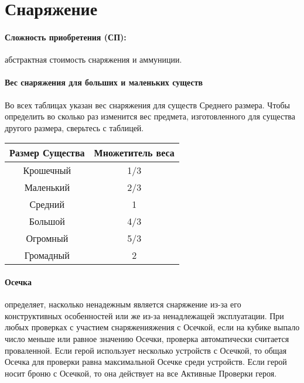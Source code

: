 \section{Снаряжение}
\paragraph{Сложность приобретения (СП):} абстрактная стоимость снаряжения и аммуниции.
\paragraph{Вес снаряжения для больших и маленьких существ}
Во всех таблицах указан вес снаряжения для существ Среднего размера. Чтобы определить во сколько раз изменится вес предмета, изготовленного для существа другого размера, сверьтесь с таблицей.
\begin{center}
\begin{tabular}{|c|c|}
\hline
Размер Существа & Множетитель веса \\ \hline
Крошечный & 1/3 \\ \hline
Маленький & 2/3 \\ \hline
Средний & 1 \\ \hline
Большой & 4/3 \\ \hline
Огромный & 5/3 \\ \hline
Громадный & 2 \\ \hline
\end{tabular}
\end{center}
\paragraph{Осечка} определяет, насколько ненадежным является снаряжение из-за его конструктивных особенностей или же из-за ненадлежащей эксплуатации. При любых проверках с участием снаряженияжения с Осечкой, если на кубике выпало число меньше или равное значению Осечки, проверка автоматически считается проваленной. Если герой использует несколько устройств с Осечкой, то общая Осечка для проверки равна максимальной Осечке среди устройств.
Если герой носит броню с Осечкой, то она действует на все Активные Проверки героя.

